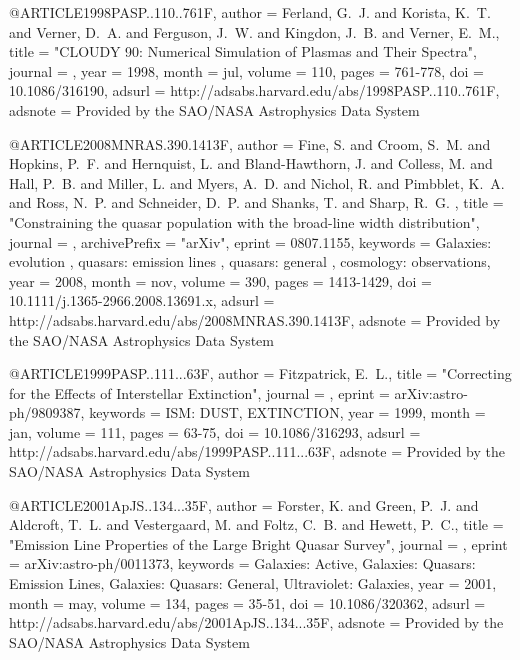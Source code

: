 \documentclass[twocolumn]{aastex62}
\begin{document}
@ARTICLE{1998PASP..110..761F,
   author = {{Ferland}, G.~J. and {Korista}, K.~T. and {Verner}, D.~A. and 
	{Ferguson}, J.~W. and {Kingdon}, J.~B. and {Verner}, E.~M.},
    title = "{CLOUDY 90: Numerical Simulation of Plasmas and Their Spectra}",
  journal = {\pasp},
     year = 1998,
    month = jul,
   volume = 110,
    pages = {761-778},
      doi = {10.1086/316190},
   adsurl = {http://adsabs.harvard.edu/abs/1998PASP..110..761F},
  adsnote = {Provided by the SAO/NASA Astrophysics Data System}
}



@ARTICLE{2008MNRAS.390.1413F,
   author = {{Fine}, S. and {Croom}, S.~M. and {Hopkins}, P.~F. and {Hernquist}, L. and 
	{Bland-Hawthorn}, J. and {Colless}, M. and {Hall}, P.~B. and 
	{Miller}, L. and {Myers}, A.~D. and {Nichol}, R. and {Pimbblet}, K.~A. and 
	{Ross}, N.~P. and {Schneider}, D.~P. and {Shanks}, T. and {Sharp}, R.~G.
	},
    title = "{Constraining the quasar population with the broad-line width distribution}",
  journal = {\mnras},
archivePrefix = "arXiv",
   eprint = {0807.1155},
 keywords = {Galaxies: evolution , quasars: emission lines , quasars: general , cosmology: observations},
     year = 2008,
    month = nov,
   volume = 390,
    pages = {1413-1429},
      doi = {10.1111/j.1365-2966.2008.13691.x},
   adsurl = {http://adsabs.harvard.edu/abs/2008MNRAS.390.1413F},
  adsnote = {Provided by the SAO/NASA Astrophysics Data System}
}

@ARTICLE{1999PASP..111...63F,
   author = {{Fitzpatrick}, E.~L.},
    title = "{Correcting for the Effects of Interstellar Extinction}",
  journal = {\pasp},
   eprint = {arXiv:astro-ph/9809387},
 keywords = {ISM: DUST, EXTINCTION},
     year = 1999,
    month = jan,
   volume = 111,
    pages = {63-75},
      doi = {10.1086/316293},
   adsurl = {http://adsabs.harvard.edu/abs/1999PASP..111...63F},
  adsnote = {Provided by the SAO/NASA Astrophysics Data System}
}



@ARTICLE{2001ApJS..134...35F,
   author = {{Forster}, K. and {Green}, P.~J. and {Aldcroft}, T.~L. and {Vestergaard}, M. and 
	{Foltz}, C.~B. and {Hewett}, P.~C.},
    title = "{Emission Line Properties of the Large Bright Quasar Survey}",
  journal = {\apjs},
   eprint = {arXiv:astro-ph/0011373},
 keywords = {Galaxies: Active, Galaxies: Quasars: Emission Lines, Galaxies: Quasars: General, Ultraviolet: Galaxies},
     year = 2001,
    month = may,
   volume = 134,
    pages = {35-51},
      doi = {10.1086/320362},
   adsurl = {http://adsabs.harvard.edu/abs/2001ApJS..134...35F},
  adsnote = {Provided by the SAO/NASA Astrophysics Data System}
}
\end{document}
